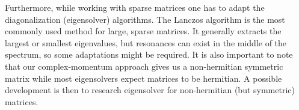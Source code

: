 \documentclass[../main/report.tex]{subfiles}
\begin{document}
Furthermore, while working with sparse matrices one has to adapt the diagonalization (eigensolver) algorithms. 
The Lanczos algorithm is the most commonly used method for large, sparse matrices.
It generally extracts the largest or smallest eigenvalues, but resonances can exist in the middle of the spectrum, so some adaptations might be required.
It is also important to note that our complex-momentum approach gives us a non-hermitian symmetric matrix while most eigensolvers expect matrices to be hermitian. A possible development is then to research eigensolver for non-hermitian (but symmetric) matrices.

\end{document}
